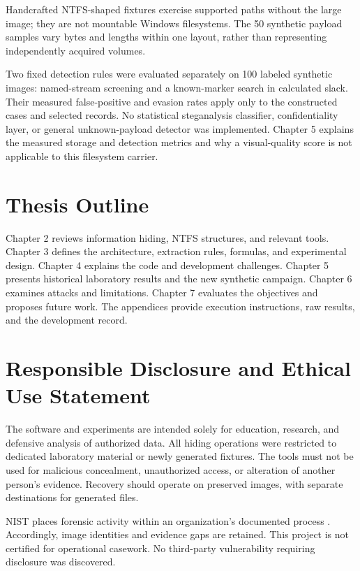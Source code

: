 Handcrafted NTFS-shaped fixtures exercise supported paths without the
large image; they are not mountable Windows filesystems. The 50 synthetic
payload samples vary bytes and lengths within one layout, rather than
representing independently acquired volumes.

Two fixed detection rules were evaluated separately on 100 labeled synthetic
images: named-stream screening and a known-marker search in calculated slack.
Their measured false-positive and evasion rates apply only to the constructed
cases and selected records. No statistical steganalysis classifier,
confidentiality layer, or general unknown-payload detector was implemented.
Chapter 5 explains the measured storage and detection metrics and why a
visual-quality score is not applicable to this filesystem carrier.

\section{Thesis Outline}
Chapter 2 reviews information hiding, NTFS structures, and relevant tools.
Chapter 3 defines the architecture, extraction rules, formulas, and
experimental design. Chapter 4 explains the code and development challenges.
Chapter 5 presents historical laboratory results and the new synthetic
campaign. Chapter 6 examines attacks and limitations. Chapter 7 evaluates
the objectives and proposes future work. The appendices provide execution
instructions, raw results, and the development record.

\section{Responsible Disclosure and Ethical Use Statement}
The software and experiments are intended solely for education, research,
and defensive analysis of authorized data. All hiding operations were
restricted to dedicated laboratory material or newly generated fixtures.
The tools must not be used for malicious concealment, unauthorized access,
or alteration of another person's evidence. Recovery should operate on
preserved images, with separate destinations for generated files.

NIST places forensic activity within an organization's documented process
\cite{nist86}. Accordingly, image identities and evidence gaps are retained.
This project is not certified for operational casework. No third-party
vulnerability requiring disclosure was discovered.
